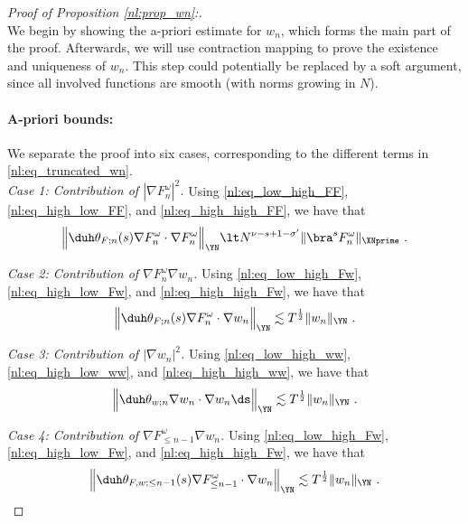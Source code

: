 \documentclass[11pt]{article}
\begin{document}
\begin{proof}[Proof of Proposition \ref{nl:prop_wn}:]~\\
We begin by showing the a-priori estimate for \( w_n \), which forms the main part of the proof. Afterwards, we will use contraction mapping to prove the existence and uniqueness of \( w_n \). This step could potentially be replaced by a soft argument, since all involved functions are smooth (with norms growing in \(N\)). 
\paragraph{A-priori bounds:}
We separate the proof into six cases, corresponding to the different terms in \eqref{nl:eq_truncated_wn}.\\

\emph{Case 1: Contribution of \( |\nabla F_n^\omega|^2 \).} Using \eqref{nl:eq_low_high_FF}, \eqref{nl:eq_high_low_FF}, and \eqref{nl:eq_high_high_FF}, we have that
\begin{equation*}  
\Big \|  \duh  \theta_{F;n}(s) \nabla F_n^\omega \cdot \nabla F_n^\omega \Big \|_{\YN} 
\lt N^{\nu-s+1-\sigma^\prime} \| \bra^s F_n^\omega \|_{\XNprime} ~. 
\end{equation*}


\emph{Case 2:  Contribution of \( \nabla F_n^\omega \nabla w_n \).} Using \eqref{nl:eq_low_high_Fw}, \eqref{nl:eq_high_low_Fw}, and \eqref{nl:eq_high_high_Fw}, we have that
\begin{equation*}  
\Big \|  \duh  \theta_{F;n}(s) \nabla F_n^\omega \cdot \nabla w_n \Big \|_{\YN} 
\lesssim T^{\frac{1}{2}}  \| w_n \|_{\YN}~. 
\end{equation*}


\emph{Case 3:  Contribution of \( |\nabla w_n|^2 \).} Using \eqref{nl:eq_low_high_ww}, \eqref{nl:eq_high_low_ww}, and \eqref{nl:eq_high_high_ww}, we have that
\begin{equation*}
\Big \|  \duh \theta_{w;n} \nabla w_n \cdot \nabla w_n \ds \Big \|_{\YN} 
\lesssim T^{\frac{1}{2}} 
 \| w_n \|_{\YN} ~. 
\end{equation*}

\emph{Case 4:  Contribution of \(  \nabla F_{\leq n-1}^\omega \nabla w_n\).} Using \eqref{nl:eq_low_high_Fw}, \eqref{nl:eq_high_low_Fw}, and \eqref{nl:eq_high_high_Fw}, we have that
\begin{equation*}  
\Big \|  \duh  \theta_{F,w;\leq n-1}(s) \nabla F_{\leq n-1}^\omega \cdot \nabla w_n \Big \|_{\YN} 
\lesssim T^{\frac{1}{2}}  
 \| w_n \|_{\YN}~.
\end{equation*} 


\end{proof}
\end{document}
